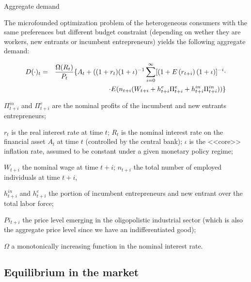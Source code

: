 \documentclass[9pt]{beamer}
\begin{document}
\begin{frame}{Aggregate demand}

The microfounded optimization problem of the heterogeneous consumers with the same preferences but different budget constraint (depending on wether they are workers, new entrants or incumbent entrepreneurs) yields the following aggregate demand:

\begin{eqnarray}
D(\cdot )_{t} &=&\frac{\Omega (R_{t})}{P_{t}}\{A_{t}+((1+r_{t})(1+\iota
)^{-1}\sum_{i=0}^{\infty }[(1+E\left( r_{t+i}\right) (1+\iota )]^{-i}\cdot 
\notag \\
&&\cdot E(n_{t+i}(W_{t+i}+h_{t+i}^{e}\Pi _{t+i}^{e}+h_{t+i}^{in}\Pi
_{t+i}^{in}))\}  \label{per capita distrib cons_1}
\end{eqnarray}

\small

$\Pi_{t+i}^{in}$ and $\Pi _{t+i}^{e}$ are the nominal profits of the incumbent and new entrants entrepreneurs;

$r_{t}$ is  the real interest rate at time $t$; $R_{t}$ is the nominal interest rate on the financial asset $A_t$ at time $t$ (controlled by the central bank); $\iota$ is the <<core>> inflation rate, assumed to be constant under a given monetary policy regime;

$W_{t+i}$ the nominal wage at time $t+i$; $n_{t+i}$ the total number of employed individuals at time $t+i$,

$h_{t+i}^{in}$ and $h_{t+i}^{e}$ the portion of incumbent entrepreneurs and new entrant over the total labor force;

$Pi _{t+i}$ the price level emerging in the oligopolistic industrial sector (which is also the aggregate price level since we have an indifferentiated good);

$\Omega$ a monotonically increasing function in the nominal interest rate.

\end{frame}




\subsection{Equilibrium in the market}
\end{document}
